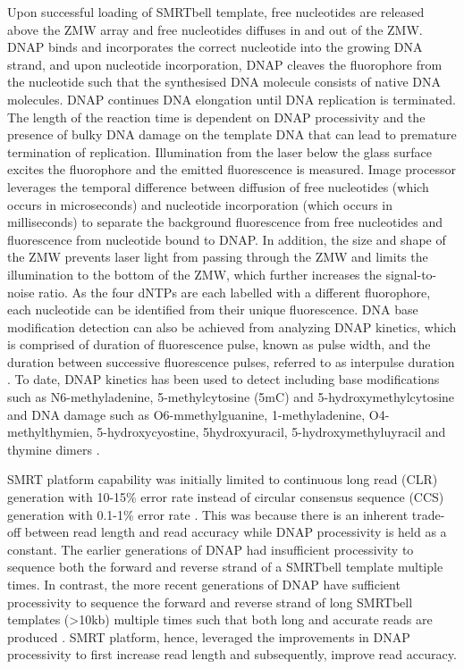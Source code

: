 Upon successful loading of SMRTbell template, free nucleotides are released above the ZMW array and free nucleotides diffuses in and out of the ZMW. DNAP binds and incorporates the correct nucleotide into the growing DNA strand, and upon nucleotide incorporation, DNAP cleaves the fluorophore from the nucleotide such that the synthesised DNA molecule consists of native DNA molecules. DNAP continues DNA elongation until DNA replication is terminated. The length of the reaction time is dependent on DNAP processivity and the presence of bulky DNA damage on the template DNA that can lead to premature termination of replication\cite{}. Illumination from the laser below the glass surface excites the fluorophore and the emitted fluorescence is measured. Image processor leverages the temporal difference between diffusion of free nucleotides (which occurs in microseconds) and nucleotide incorporation (which occurs in milliseconds) to separate the background fluorescence from free nucleotides and fluorescence from nucleotide bound to DNAP. In addition, the size and shape of the ZMW prevents laser light from passing through the ZMW and limits the illumination to the bottom of the ZMW, which further increases the signal-to-noise ratio. As the four dNTPs are each labelled with a different fluorophore, each nucleotide can be identified from their unique fluorescence\cite{Eid2009-ol}. DNA base modification detection can also be achieved from analyzing DNAP kinetics, which is comprised of duration of fluorescence pulse, known as pulse width, and the duration between successive fluorescence pulses, referred to as interpulse duration \cite{Flusberg2010-ub}. To date, DNAP kinetics has been used to detect including base modifications such as N6-methyladenine, 5-methylcytosine (5mC) and 5-hydroxymethylcytosine \cite{Flusberg2010-ub} and DNA damage such as O6-mmethylguanine, 1-methyladenine, O4-methylthymien, 5-hydroxycyostine, 5hydroxyuracil, 5-hydroxymethyluyracil and thymine dimers \cite{Clark2011-jz}. 

SMRT platform capability was initially limited to continuous long read (CLR) generation with 10-15\% error rate \cite{Eid2009-ol} instead of circular consensus sequence (CCS) generation with 0.1-1\% error rate \cite{Wenger2019-pw}. This was because there is an inherent trade-off between read length and read accuracy while DNAP processivity is held as a constant. The earlier generations of DNAP had insufficient processivity to sequence both the forward and reverse strand of a SMRTbell template multiple times. In contrast, the more recent generations of DNAP have sufficient processivity to sequence the forward and reverse strand of long SMRTbell templates (>10kb) multiple times such that both long and accurate reads are produced \cite{Wenger2019-pw}. SMRT platform, hence, leveraged the improvements in DNAP processivity to first increase read length and subsequently, improve read accuracy. 

